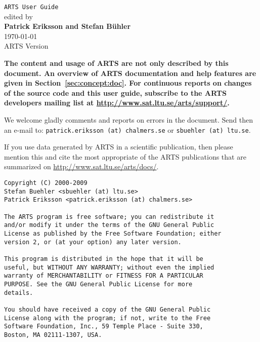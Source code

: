 



%
\renewcommand{\thepage}{title \arabic{page}} 

\thispagestyle{plain}
\begin{center}
  \vspace*{1cm}
  {\Huge \verb|ARTS User Guide|\\}
  \vspace*{1cm}
  {\large edited by \\}
  \vspace*{1cm}
  {\Large \bf Patrick Eriksson and Stefan B\"uhler }\\
   \vspace*{2cm}
   {\large \today\\
    ARTS Version 
   }
\end{center}
\vspace*{\fill}
{\normalsize \bf
  \noindent
  The content and usage of ARTS are not only described by this
  document. An overview of ARTS documentation and help features are
  given in Section~\ref{sec:concept:doc}. For continuous reports on
  changes of the source code and this user guide, subscribe to the
  ARTS developers mailing list at \url{http://www.sat.ltu.se/arts/support/}.

  We welcome gladly comments and reports on errors in the document.
  Send then an e-mail to: \verb|patrick.eriksson (at) chalmers.se| or 
  \verb|sbuehler (at) ltu.se|.

  If you use data generated by ARTS in a scientific
  publication, then please mention this and cite the most
  appropriate of the ARTS publications that are summarized on
  \url{http://www.sat.ltu.se/arts/docs/}.
}

\newpage                          
\thispagestyle{empty}
\vspace*{\fill}
\noindent
\begin{verbatim}
Copyright (C) 2000-2009
Stefan Buehler <sbuehler (at) ltu.se>
Patrick Eriksson <patrick.eriksson (at) chalmers.se>

The ARTS program is free software; you can redistribute it
and/or modify it under the terms of the GNU General Public
License as published by the Free Software Foundation; either
version 2, or (at your option) any later version.

This program is distributed in the hope that it will be
useful, but WITHOUT ANY WARRANTY; without even the implied
warranty of MERCHANTABILITY or FITNESS FOR A PARTICULAR
PURPOSE. See the GNU General Public License for more
details. 

You should have received a copy of the GNU General Public
License along with the program; if not, write to the Free
Software Foundation, Inc., 59 Temple Place - Suite 330,
Boston, MA 02111-1307, USA. 
\end{verbatim}




